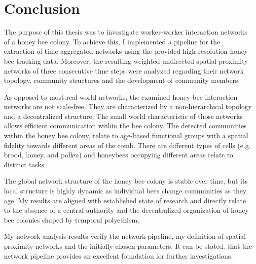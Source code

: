 \chapter{Conclusion}
\label{ch:conclusion}

The purpose of this thesis was to investigate worker-worker interaction networks of a honey bee colony.
To achieve this, I implemented a pipeline for the extraction of time-aggregated networks using the provided high-resolution honey bee tracking data.
Moreover, the resulting weighted undirected spatial proximity networks of three consecutive time steps were analyzed regarding their network topology, community structures and the development of community members.

As opposed to most real-world networks, the examined honey bee interaction networks are not scale-free. They are characterized by a non-hierarchical topology and a decentralized structure.
The small world characteristic of those networks allows efficient communication within the bee colony.
The detected communities within the honey bee colony, relate to age-based functional groups with a spatial fidelity towards different areas of the comb.
There are different types of cells (e.g. brood, honey, and pollen) and honeybees occupying different areas relate to distinct tasks.

The global network structure of the honey bee colony is stable over time, but its local structure is highly dynamic as individual bees change communities as they age.
My results are aligned with established state of research and directly relate to the absence of a central authority and the decentralized organization of honey bee colonies shaped by temporal polyethism.

My network analysis results verify the network pipeline, my definition of spatial proximity networks and the initially chosen parameters.
It can be stated, that the network pipeline provides an excellent foundation for further investigations.

